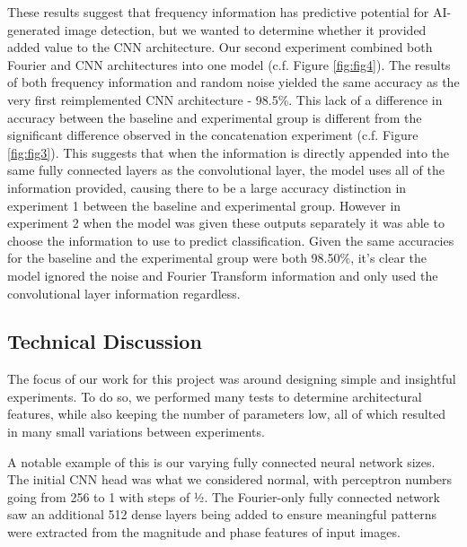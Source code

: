 These results suggest that frequency information has predictive potential for AI-generated image detection, but we wanted to determine whether it provided added value to the CNN architecture. Our second experiment combined both Fourier and CNN architectures into one model (c.f. Figure \ref{fig:fig4}). The results of both frequency information and random noise yielded the same accuracy as the very first reimplemented CNN architecture - 98.5\%. This lack of a difference in accuracy between the baseline and experimental group is different from the significant difference observed in the concatenation experiment (c.f. Figure \ref{fig:fig3}). This suggests that when the information is directly appended into the same fully connected layers as the convolutional layer, the model uses all of the information provided, causing there to be a large accuracy distinction in experiment 1 between the baseline and experimental group. However in experiment 2 when the model was given these outputs separately it was able to choose the information to use to predict classification. Given the same accuracies for the baseline and the experimental group were both 98.50\%, it’s clear the model ignored the noise and Fourier Transform information and only used the convolutional layer information regardless.


\subsection{Technical Discussion}

The focus of our work for this project was around designing simple and insightful experiments. To do so, we performed many tests to determine architectural features, while also keeping the number of parameters low, all of which resulted in many small variations between experiments.

A notable example of this is our varying fully connected neural network sizes. The initial CNN head was what we considered normal, with perceptron numbers going from 256 to 1 with steps of ½. The Fourier-only fully connected network saw an additional 512 dense layers being added to ensure meaningful patterns were extracted from the magnitude and phase features of input images.

